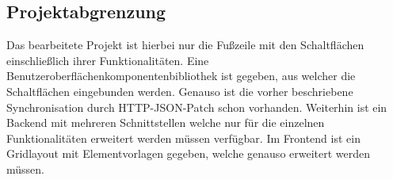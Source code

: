 \subsection{Projektabgrenzung}
\label{projektabgrenzung}
Das bearbeitete Projekt ist hierbei nur die Fußzeile mit den Schaltflächen einschließlich ihrer Funktionalitäten. Eine Benutzeroberflächenkomponentenbibliothek ist gegeben, aus welcher die Schaltflächen eingebunden werden. Genauso ist die vorher beschriebene Synchronisation durch HTTP-JSON-Patch schon vorhanden. Weiterhin ist ein Backend mit mehreren Schnittstellen welche nur für die einzelnen Funktionalitäten erweitert werden müssen verfügbar. Im Frontend ist ein Gridlayout mit Elementvorlagen gegeben, welche genauso erweitert werden müssen.